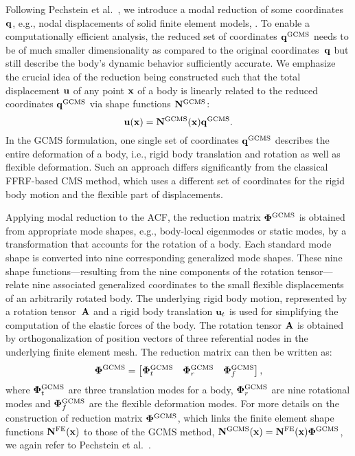 Following Pechstein et al.~\cite{pechstein2013}, we introduce a modal reduction of some coordinates~$\mathbf q$, e.g., nodal displacements of solid finite element models,
\be
  \q \approx \phigcms \qgcms. 
\ee
To enable a computationally efficient analysis, the reduced set of coordinates $\mathbf q^{\rm GCMS}$ needs to be of much smaller dimensionality as compared to the original coordinates~$\mathbf q$ but still describe the body's dynamic behavior sufficiently accurate.
We emphasize the crucial idea of the reduction being constructed such that the total displacement $\mathbf u$ of any point $\mathbf x$ of a body is linearly related to the reduced coordinates $\mathbf q^{\rm GCMS}$ via shape functions $\mathbf N^{\rm GCMS}$:
\begin{equation} \label{eq:lin}
\mathbf u(\mathbf x) = \mathbf N^{\rm GCMS} (\mathbf x) \mathbf q^{\rm GCMS} .
\end{equation}
In the GCMS formulation, one single set of coordinates $\mathbf q^{\rm GCMS}$ describes the entire deformation of a body, i.e., rigid body translation and rotation as well as flexible deformation. 
Such an approach differs significantly from the classical FFRF-based CMS method, which uses a different set of coordinates for the rigid body motion and the flexible part of displacements.

Applying modal reduction to the ACF, the reduction matrix $\bm \Phi^{\rm GCMS}$ is obtained from appropriate mode shapes, e.g., body-local eigenmodes or static modes, by a transformation that accounts for the rotation of a body. 
Each standard mode shape is converted into nine corresponding generalized mode shapes.
These nine shape functions---resulting from the nine components of the rotation tensor---relate nine associated generalized coordinates to the small flexible displacements of an arbitrarily rotated body.
The underlying rigid body motion, represented by a rotation tensor~$\mathbf A$ and a rigid body translation $\mathbf u_{t}$ is used for simplifying the computation of the elastic forces of the body.
The rotation tensor $\mathbf A$ is obtained by orthogonalization of position vectors of three referential nodes in the underlying finite element mesh. The reduction matrix can then be written as:
\begin{equation}
\bm \Phi^{\rm GCMS} = \begin{bmatrix} \bm \Phi^{\rm GCMS}_t & \bm \Phi^{\rm GCMS}_r & \bm \Phi^{\rm GCMS}_f\end{bmatrix},
\label{eq:phigcms}
\end{equation}
where $\bm \Phi^{\rm GCMS}_t$ are three translation modes for a body, $\bm \Phi^{\rm GCMS}_r$ are nine rotational modes and $\bm \Phi^{\rm GCMS}_f$ are the flexible deformation modes. 
For more details on the construction of reduction matrix $\bm \Phi^{\rm GCMS}$, which links the finite element shape functions $\mathbf N^{\rm FE}(\mathbf x)$ to those of the GCMS method, $\mathbf N^{\rm GCMS}(\mathbf x) = \mathbf N^{\rm FE}(\mathbf x) \bm \Phi^{\rm GCMS}$, we again refer to Pechstein et al.~\cite{pechstein2013}.

